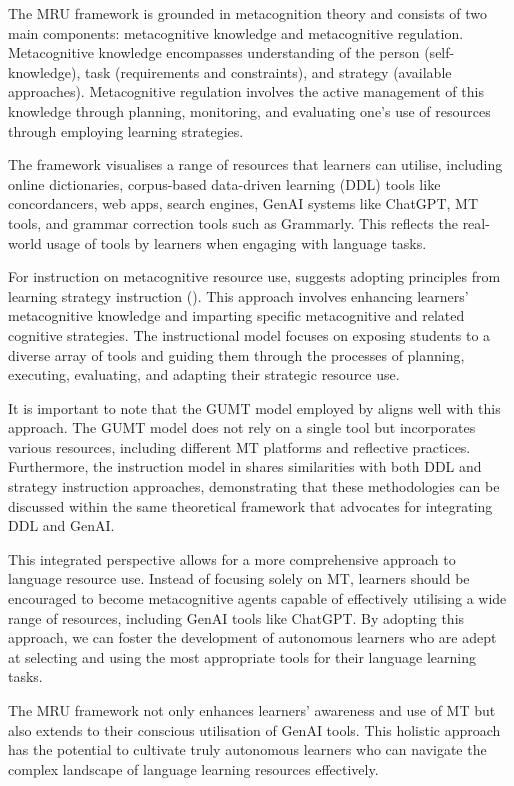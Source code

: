 \documentclass[output=paper]{langscibook}
\begin{document}
The MRU framework is grounded in metacognition theory and consists of two main components: metacognitive knowledge and metacognitive regulation. Metacognitive knowledge encompasses understanding of the person (self-knowledge), task (requirements and constraints), and strategy (available approaches). Metacognitive regulation involves the active management of this knowledge through planning, monitoring, and evaluating one’s use of resources through employing learning strategies.

The framework visualises a range of resources that learners can utilise, including online dictionaries, corpus-based data-driven learning (DDL) tools like concordancers, web apps, search engines, GenAI systems like ChatGPT, MT tools, and grammar correction tools such as Grammarly. This reflects the real-world usage of tools by learners when engaging with language tasks.

For instruction on metacognitive resource use, \citet{mizumoto23} suggests adopting principles from learning strategy instruction (\citealt{chamotharris19}). This approach involves enhancing learners’ metacognitive knowledge and imparting specific metacognitive and related cognitive strategies. The instructional model focuses on exposing students to a diverse array of tools and guiding them through the processes of planning, executing, evaluating, and adapting their strategic resource use.

It is important to note that the GUMT model employed by \citet{ryu2022} aligns well with this approach. The GUMT model does not rely on a single tool but incorporates various resources, including different MT platforms and reflective practices. Furthermore, the instruction model in \citet{ryu2022} shares similarities with both DDL and strategy instruction approaches, demonstrating that these methodologies can be discussed within the same theoretical framework that \citet{mizumoto23} advocates for integrating DDL and GenAI.

This integrated perspective allows for a more comprehensive approach to language resource use. Instead of focusing solely on MT, learners should be encouraged to become metacognitive agents capable of effectively utilising a wide range of resources, including GenAI tools like ChatGPT. By adopting this approach, we can foster the development of autonomous learners who are adept at selecting and using the most appropriate tools for their language learning tasks.

The MRU framework not only enhances learners’ awareness and use of MT but also extends to their conscious utilisation of GenAI tools. This holistic approach has the potential to cultivate truly autonomous learners who can navigate the complex landscape of language learning resources effectively.
\end{document}
